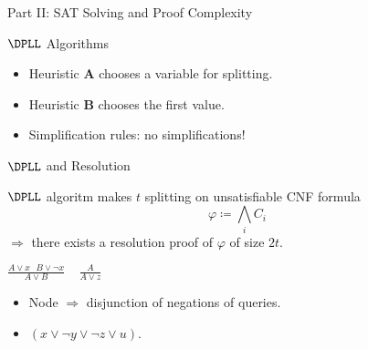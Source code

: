 \begin{frame}

    \begin{center}
        \Huge Part II: SAT Solving and Proof Complexity
    \end{center}
    
\end{frame}

\begin{frame}{$\DPLL$ Algorithms}

    \begin{center}
                
    \end{center}

    
	\pause
    \pause
    \pause
    \pause
    \pause
    \begin{itemize}
        \item Heuristic $\mathbf{A}$ chooses a variable for splitting.
    	\pause
	    \item Heuristic $\mathbf{B}$ chooses the first value.
    	\pause
    	\item Simplification rules: \alert{no simplifications!}
    \end{itemize}
\end{frame}

\begin{frame}{$\DPLL$ and Resolution}
    
    \begin{theorem}
        $\DPLL$ algoritm makes $t$ splitting on \alert{unsatisfiable} CNF formula
        $$\varphi \coloneqq \bigwedge\limits_i C_i$$
        $\Rightarrow$ there exists a resolution proof of $\varphi$ of size $2t$.
    \end{theorem}

    \pause

    \begin{minipage}{0.58\linewidth}
        \centering
        
    \end{minipage}
    \pause
    \begin{minipage}{0.4\linewidth}
        \centering
        $\frac{A \lor x ~~~ B \lor \neg x}{A \lor B} ~~~~~ \frac{A}{A \lor z}$
        \begin{itemize}
            \item Node $\Rightarrow$ disjunction of negations of queries.
            \item $(x \lor \neg y \lor \neg z \lor u)$.
        \end{itemize}
    \end{minipage}

\end{frame}

